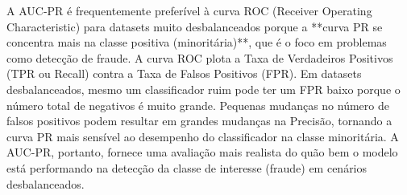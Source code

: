 \documentclass{article}
\begin{document}
\begin{enumerate}
    A AUC-PR é frequentemente preferível à curva ROC (Receiver Operating Characteristic) para datasets muito desbalanceados porque a **curva PR se concentra mais na classe positiva (minoritária)**, que é o foco em problemas como detecção de fraude. A curva ROC plota a Taxa de Verdadeiros Positivos (TPR ou Recall) contra a Taxa de Falsos Positivos (FPR). Em datasets desbalanceados, mesmo um classificador ruim pode ter um FPR baixo porque o número total de negativos é muito grande. Pequenas mudanças no número de falsos positivos podem resultar em grandes mudanças na Precisão, tornando a curva PR mais sensível ao desempenho do classificador na classe minoritária. A AUC-PR, portanto, fornece uma avaliação mais realista do quão bem o modelo está performando na detecção da classe de interesse (fraude) em cenários desbalanceados.
\end{enumerate}
\end{document}
